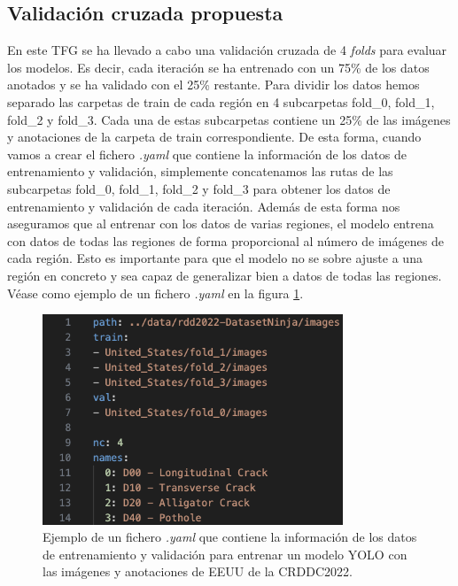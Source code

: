 \subsection{Validación cruzada propuesta}
En este TFG se ha llevado a cabo una validación cruzada de 4 \textit{folds} para evaluar los modelos. Es decir, cada iteración se ha entrenado con un 75\% de los datos anotados y se ha validado con el 25\% restante. Para dividir los datos hemos separado las carpetas de train de cada región en 4 subcarpetas fold\_0, fold\_1, fold\_2 y fold\_3. Cada una de estas subcarpetas contiene un 25\% de las imágenes y anotaciones de la carpeta de train correspondiente. De esta forma, cuando vamos a crear el fichero \textit{.yaml} que contiene la información de los datos de entrenamiento y validación, simplemente concatenamos las rutas de las subcarpetas fold\_0, fold\_1, fold\_2 y fold\_3 para obtener los datos de entrenamiento y validación de cada iteración. Además de esta forma nos aseguramos que al entrenar con los datos de varias regiones, el modelo entrena con datos de todas las regiones de forma proporcional al número de imágenes de cada región. Esto es importante para que el modelo no se sobre ajuste a una región en concreto y sea capaz de generalizar bien a datos de todas las regiones. Véase como ejemplo de un fichero \textit{.yaml} en la figura \ref{fig:yaml_example}.

\begin{figure}[H]
    \centering
    \includegraphics[width=0.8\textwidth]{img/yaml_example.png}
    \caption{Ejemplo de un fichero \textit{.yaml} que contiene la información de los datos de entrenamiento y validación para entrenar un modelo YOLO con las imágenes y anotaciones de EEUU de la CRDDC2022.}
    \label{fig:yaml_example}
\end{figure}

